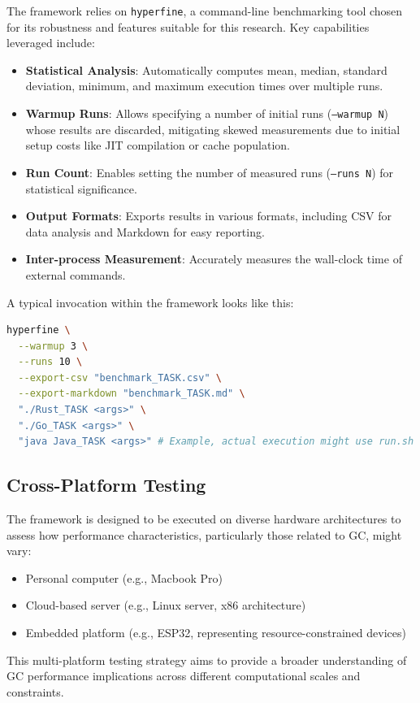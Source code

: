 The framework relies on \texttt{hyperfine}, a command-line benchmarking tool chosen for its robustness and features suitable for this research. Key capabilities leveraged include:
\begin{itemize}
    \item \textbf{Statistical Analysis}: Automatically computes mean, median, standard deviation, minimum, and maximum execution times over multiple runs.
    \item \textbf{Warmup Runs}: Allows specifying a number of initial runs (\texttt{--warmup N}) whose results are discarded, mitigating skewed measurements due to initial setup costs like JIT compilation or cache population.
    \item \textbf{Run Count}: Enables setting the number of measured runs (\texttt{--runs N}) for statistical significance.
    \item \textbf{Output Formats}: Exports results in various formats, including CSV for data analysis and Markdown for easy reporting.
    \item \textbf{Inter-process Measurement}: Accurately measures the wall-clock time of external commands.
\end{itemize}
A typical invocation within the framework looks like this:
\begin{lstlisting}[language=bash, caption={Example hyperfine usage in benchmark.sh }, style=shstyle]
hyperfine \
  --warmup 3 \
  --runs 10 \
  --export-csv "benchmark_TASK.csv" \
  --export-markdown "benchmark_TASK.md" \
  "./Rust_TASK <args>" \
  "./Go_TASK <args>" \
  "java Java_TASK <args>" # Example, actual execution might use run.sh
\end{lstlisting}

\subsection{Cross-Platform Testing} %

The framework is designed to be executed on diverse hardware architectures to assess how performance characteristics, particularly those related to GC, might vary:
\begin{itemize}
    \item Personal computer (e.g., Macbook Pro) 
    \item Cloud-based server (e.g., Linux server, x86 architecture) 
    \item Embedded platform (e.g., ESP32, representing resource-constrained devices) 
\end{itemize}
This multi-platform testing strategy aims to provide a broader understanding of GC performance implications across different computational scales and constraints.

